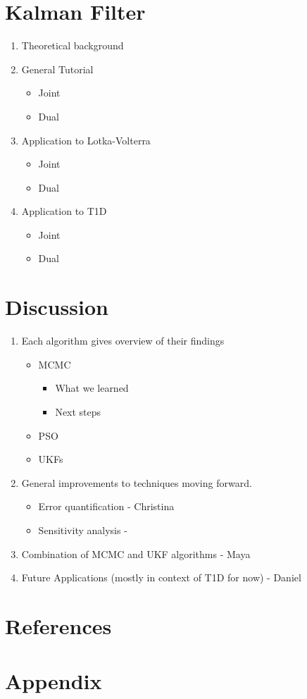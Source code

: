 \documentclass{article}
\begin{document}
\section{Kalman Filter}
\begin{enumerate}
    \item Theoretical background
    \item General Tutorial
    \begin{itemize}
        \item Joint
        \item Dual
    \end{itemize}
    \item Application to Lotka-Volterra
    \begin{itemize}
        \item Joint
        \item Dual
    \end{itemize}
    \item Application to T1D
    \begin{itemize}
        \item Joint
        \item Dual
    \end{itemize}
\end{enumerate}

\section{Discussion}
\begin{enumerate}
    \item Each algorithm gives overview of their findings
    \begin{itemize}
        \item MCMC
        \begin{itemize}
            \item What we learned
            \item Next steps
        \end{itemize}
        \item PSO
        \item UKFs
    \end{itemize}
    \item General improvements to techniques moving forward.
    \begin{itemize}
        \item Error quantification - Christina
        \item Sensitivity analysis - 
    \end{itemize}
    \item Combination of MCMC and UKF algorithms - Maya
    \item Future Applications (mostly in context of T1D for now) - Daniel
\end{enumerate}


\section{References}
\section{Appendix}
\end{document}

